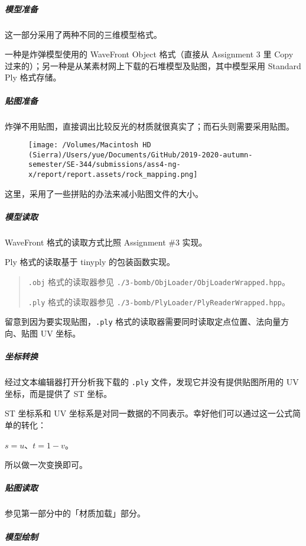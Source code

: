 \documentclass[
]{article}
\begin{document}
\hypertarget{header-n208}{%
\subparagraph{模型准备}\label{header-n208}}

这一部分采用了两种不同的三维模型格式。

一种是炸弹模型使用的 WaveFront Object 格式（直接从 Assignment 3 里 Copy
过来的）；另一种是从某素材网上下载的石堆模型及贴图，其中模型采用
Standard Ply 格式存储。

\hypertarget{header-n211}{%
\subparagraph{贴图准备}\label{header-n211}}

炸弹不用贴图，直接调出比较反光的材质就很真实了；而石头则需要采用贴图。

\begin{figure}
\centering
\texttt{[image: /Volumes/Macintosh HD (Sierra)/Users/yue/Documents/GitHub/2019-2020-autumn-semester/SE-344/submissions/ass4-ng-x/report/report.assets/rock\_mapping.png]}
\caption{}
\end{figure}

这里，采用了一些拼贴的办法来减小贴图文件的大小。

\hypertarget{header-n215}{%
\subparagraph{模型读取}\label{header-n215}}

WaveFront 格式的读取方式比照 Assignment \#3 实现。

Ply 格式的读取基于 tinyply 的包装函数实现。

\begin{quote}
\texttt{.obj} 格式的读取器参见
\texttt{./3-bomb/ObjLoader/ObjLoaderWrapped.hpp}。

\texttt{.ply} 格式的读取器参见
\texttt{./3-bomb/PlyLoader/PlyReaderWrapped.hpp}。
\end{quote}

留意到因为要实现贴图，\texttt{.ply}
格式的读取器需要同时读取定点位置、法向量方向、贴图 UV 坐标。

\hypertarget{header-n234}{%
\subparagraph{坐标转换}\label{header-n234}}

经过文本编辑器打开分析我下载的 \texttt{.ply}
文件，发现它并没有提供贴图所用的 UV 坐标，而是提供了 ST 坐标。

ST 坐标系和 UV
坐标系是对同一数据的不同表示。幸好他们可以通过这一公式简单的转化：

\(s = u\)、\(t = 1 - v\)。

所以做一次变换即可。

\hypertarget{header-n246}{%
\subparagraph{贴图读取}\label{header-n246}}

参见第一部分中的「材质加载」部分。

\hypertarget{header-n254}{%
\subparagraph{模型绘制}\label{header-n254}}
\end{document}
